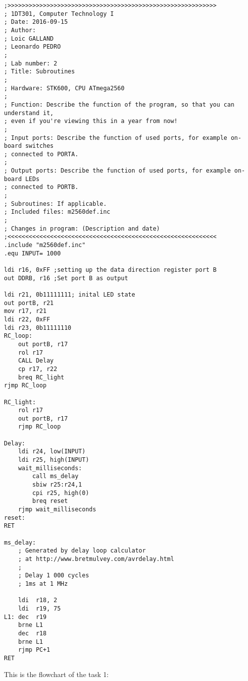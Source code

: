 \documentclass[a4paper,12pt]{article}
\begin{document}
\lstset{style=Asm}
\begin{lstlisting}
;>>>>>>>>>>>>>>>>>>>>>>>>>>>>>>>>>>>>>>>>>>>>>>>>>>>>>>>>>>>
; 1DT301, Computer Technology I
; Date: 2016-09-15
; Author:
; Loic GALLAND
; Leonardo PEDRO
;
; Lab number: 2
; Title: Subroutines
;
; Hardware: STK600, CPU ATmega2560
;
; Function: Describe the function of the program, so that you can understand it,
; even if you're viewing this in a year from now!
;
; Input ports: Describe the function of used ports, for example on-board switches
; connected to PORTA.
;
; Output ports: Describe the function of used ports, for example on-board LEDs
; connected to PORTB.
;
; Subroutines: If applicable.
; Included files: m2560def.inc
;
; Changes in program: (Description and date)
;<<<<<<<<<<<<<<<<<<<<<<<<<<<<<<<<<<<<<<<<<<<<<<<<<<<<<<<<<<<
.include "m2560def.inc"
.equ INPUT= 1000

ldi r16, 0xFF ;setting up the data direction register port B
out DDRB, r16 ;Set port B as output

ldi r21, 0b11111111; inital LED state
out portB, r21
mov r17, r21
ldi r22, 0xFF
ldi r23, 0b11111110
RC_loop:
	out portB, r17
	rol r17
	CALL Delay
	cp r17, r22
	breq RC_light
rjmp RC_loop

RC_light:
	rol r17
	out portB, r17
	rjmp RC_loop

Delay:
	ldi r24, low(INPUT)
	ldi r25, high(INPUT)
	wait_milliseconds:
		call ms_delay
		sbiw r25:r24,1
		cpi r25, high(0)
		breq reset
	rjmp wait_milliseconds
reset:
RET

ms_delay:
	; Generated by delay loop calculator
	; at http://www.bretmulvey.com/avrdelay.html
	;
	; Delay 1 000 cycles
	; 1ms at 1 MHz

	ldi  r18, 2
	ldi  r19, 75
L1: dec  r19
	brne L1
	dec  r18
	brne L1
	rjmp PC+1
RET
\end{lstlisting}

\newpage
This is the flowchart of the task 1:
\begin{center}
\end{center}






\end{document}
